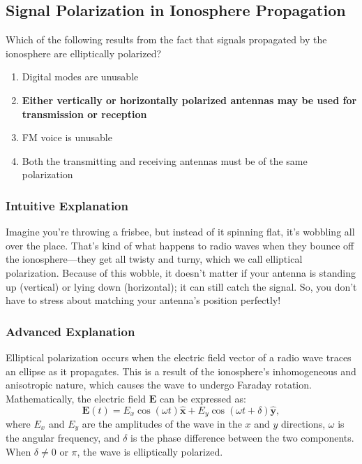 \subsection{Signal Polarization in Ionosphere Propagation}
\label{T3A09}

\begin{tcolorbox}[colback=gray!10!white,colframe=black!75!black,title=T3A09]
Which of the following results from the fact that signals propagated by the ionosphere are elliptically polarized?
\begin{enumerate}[label=\Alph*]
    \item Digital modes are unusable
    \item \textbf{Either vertically or horizontally polarized antennas may be used for transmission or reception}
    \item FM voice is unusable
    \item Both the transmitting and receiving antennas must be of the same polarization
\end{enumerate}
\end{tcolorbox}

\subsubsection{Intuitive Explanation}
Imagine you’re throwing a frisbee, but instead of it spinning flat, it’s wobbling all over the place. That’s kind of what happens to radio waves when they bounce off the ionosphere—they get all twisty and turny, which we call elliptical polarization. Because of this wobble, it doesn’t matter if your antenna is standing up (vertical) or lying down (horizontal); it can still catch the signal. So, you don’t have to stress about matching your antenna’s position perfectly!

\subsubsection{Advanced Explanation}
Elliptical polarization occurs when the electric field vector of a radio wave traces an ellipse as it propagates. This is a result of the ionosphere’s inhomogeneous and anisotropic nature, which causes the wave to undergo Faraday rotation. Mathematically, the electric field \( \mathbf{E} \) can be expressed as:
\[
\mathbf{E}(t) = E_x \cos(\omega t) \hat{\mathbf{x}} + E_y \cos(\omega t + \delta) \hat{\mathbf{y}},
\]
where \( E_x \) and \( E_y \) are the amplitudes of the wave in the \( x \) and \( y \) directions, \( \omega \) is the angular frequency, and \( \delta \) is the phase difference between the two components. When \( \delta \neq 0 \) or \( \pi \), the wave is elliptically polarized.

